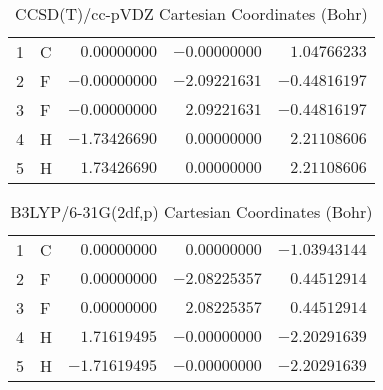 \documentclass[10pt,oneside]{article}
\begin{document}
\begin{table}[h!]
\centering
\caption{CCSD(T)/cc-pVDZ Cartesian Coordinates (Bohr)}
\begin{tabular}{llrrr}
1  & C  & $ 0.00000000$ & $-0.00000000$ & $ 1.04766233$ \\
2  & F  & $-0.00000000$ & $-2.09221631$ & $-0.44816197$ \\
3  & F  & $-0.00000000$ & $ 2.09221631$ & $-0.44816197$ \\
4  & H  & $-1.73426690$ & $ 0.00000000$ & $ 2.21108606$ \\
5  & H  & $ 1.73426690$ & $ 0.00000000$ & $ 2.21108606$ \\
\end{tabular}
\end{table}

\begin{table}[h!]
\centering
\caption{B3LYP/6-31G(2df,p) Cartesian Coordinates (Bohr)}
\begin{tabular}{llrrr}
1  & C  & $ 0.00000000$ & $ 0.00000000$ & $-1.03943144$ \\
2  & F  & $ 0.00000000$ & $-2.08225357$ & $ 0.44512914$ \\
3  & F  & $ 0.00000000$ & $ 2.08225357$ & $ 0.44512914$ \\
4  & H  & $ 1.71619495$ & $-0.00000000$ & $-2.20291639$ \\
5  & H  & $-1.71619495$ & $-0.00000000$ & $-2.20291639$ \\
\end{tabular}
\end{table}

\clearpage
\end{document}
